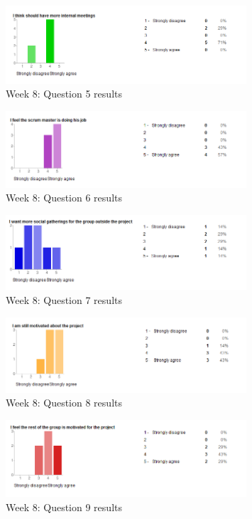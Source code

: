 \begin{figure}[h!]
\caption{Week 8: Question 5 results}
\centering
\includegraphics[width=0.8\textwidth]{evaluation/week_8_images/internal_meetings}
\end{figure}

\begin{figure}[h!]
\caption{Week 8: Question 6 results}
\centering
\includegraphics[width=0.8\textwidth]{evaluation/week_8_images/scrum_master}
\end{figure}

\begin{figure}[h!]
\caption{Week 8: Question 7 results}
\centering
\includegraphics[width=0.8\textwidth]{evaluation/week_8_images/social}
\end{figure}

\begin{figure}[h!]
\caption{Week 8: Question 8 results}
\centering
\includegraphics[width=0.8\textwidth]{evaluation/week_8_images/i_motivated}
\end{figure}

\begin{figure}[h!]
\caption{Week 8: Question 9 results}
\centering
\includegraphics[width=0.8\textwidth]{evaluation/week_8_images/them_motivated}
\end{figure}

